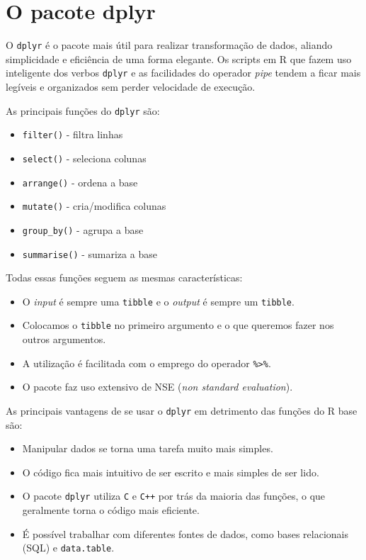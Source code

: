 \documentclass[]{book}
\providecommand{\tightlist}{%
  \setlength{\itemsep}{0pt}\setlength{\parskip}{0pt}}
\begin{document}
\hypertarget{o-pacote-dplyr}{%
\section{O pacote dplyr}\label{o-pacote-dplyr}}

O \texttt{dplyr} é o pacote mais útil para realizar transformação de dados, aliando simplicidade e eficiência de uma forma elegante. Os scripts em R que fazem uso inteligente dos verbos \texttt{dplyr} e as facilidades do operador \emph{pipe} tendem a ficar mais legíveis e organizados sem perder velocidade de execução.

As principais funções do \texttt{dplyr} são:

\begin{itemize}
\tightlist
\item
  \texttt{filter()} - filtra linhas
\item
  \texttt{select()} - seleciona colunas
\item
  \texttt{arrange()} - ordena a base
\item
  \texttt{mutate()} - cria/modifica colunas
\item
  \texttt{group\_by()} - agrupa a base
\item
  \texttt{summarise()} - sumariza a base
\end{itemize}

Todas essas funções seguem as mesmas características:

\begin{itemize}
\tightlist
\item
  O \emph{input} é sempre uma \texttt{tibble} e o \emph{output} é sempre um \texttt{tibble}.
\item
  Colocamos o \texttt{tibble} no primeiro argumento e o que queremos fazer nos outros argumentos.
\item
  A utilização é facilitada com o emprego do operador \texttt{\%\textgreater{}\%}.
\item
  O pacote faz uso extensivo de NSE (\emph{non standard evaluation}).
\end{itemize}

As principais vantagens de se usar o \texttt{dplyr} em detrimento das funções do R base são:

\begin{itemize}
\tightlist
\item
  Manipular dados se torna uma tarefa muito mais simples.
\item
  O código fica mais intuitivo de ser escrito e mais simples de ser lido.
\item
  O pacote \texttt{dplyr} utiliza \texttt{C} e \texttt{C++} por trás da maioria das funções, o que geralmente torna o código mais eficiente.
\item
  É possível trabalhar com diferentes fontes de dados, como bases relacionais (SQL) e \texttt{data.table}.
\end{itemize}
\end{document}
